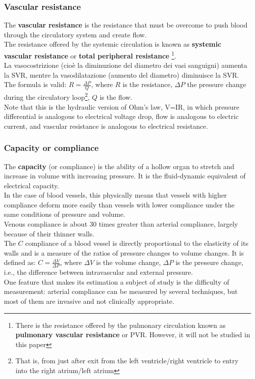 \subsubsection{Vascular resistance}
The \textbf{vascular resistance} is the resistance that must be overcome to push blood through the circulatory system and create flow. 
\\
The resistance offered by the systemic circulation is known as \textbf{systemic vascular resistance} or \textbf{total peripheral resistance} \footnote{There is the resistance offered by the pulmonary circulation known as \textbf{pulmonary vascular resistance} or PVR. However, it will not be studied in this paper}.
\\La vasocostrizione (cioè la diminuzione del diametro dei vasi sanguigni) aumenta la SVR, mentre la vasodilatazione (aumento del diametro) diminuisce la SVR.
\\
The formula is valid: $R=\frac{\Delta P}{Q}$, where $R$ is the resistance, $\Delta P$ the pressure change during the circulatory loop\footnote{That is, from just after exit from the left ventricle/right ventricle to entry into the right atrium/left atrium}, $Q$ is the flow.\\
Note that this is the hydraulic version of Ohm's law, V=IR, in which pressure differential is analogous to electrical voltage drop, flow is analogous to electric current, and vascular resistance is analogous to electrical resistance.

\newpage
\subsubsection{Capacity or compliance}\label{capacitanza}
The \textbf{capacity} (or compliance) is the ability of a hollow organ to stretch and increase in volume with increasing pressure. It is the fluid-dynamic equivalent of electrical capacity.\\
In the case of blood vessels, this physically means that vessels with higher compliance deform more easily than vessels with lower compliance under the same conditions of pressure and volume. \\
Venous compliance is about 30 times greater than arterial compliance, largely because of their thinner walls.\\
The $C$ compliance of a blood vessel is directly proportional to the elasticity of its walls and is a measure of the ratios of pressure changes to volume changes. It is defined as: $C=\frac{\Delta V}{\Delta P}$, where $\Delta V$ is the volume change, $\Delta P$ is the pressure change, i.e., the difference between intravascular and external pressure.\\
One feature that makes its estimation a subject of study is the difficulty of measurement: arterial compliance can be measured by several techniques, but most of them are invasive and not clinically appropriate. 

